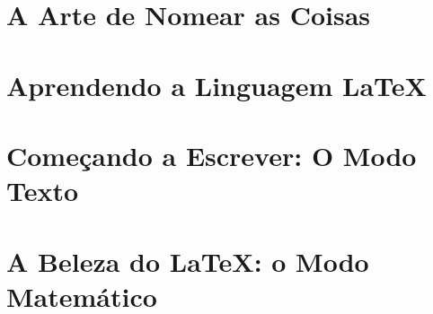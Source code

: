 \documentclass{minicursoUFRB}
\begin{document}
%
  \capa
%
  \thispagestyle{empty}
  \tableofcontents
%
  \flushbottom
  \newpage
%
  
%
  \pagestyle{fancynotes}
%
  \part{A Arte de Nomear as Coisas}	
%
    
%
  \part{Aprendendo a Linguagem LaTeX}
%
    
%
  \part{Começando a Escrever: O Modo Texto}
%
    
%
  \part{A Beleza do \LaTeX: o Modo Matemático}
%
    
%    
  \clearpage
  \thispagestyle{empty}
  \nocite{*}
  \printbibliography
%
%  
\end{document}
